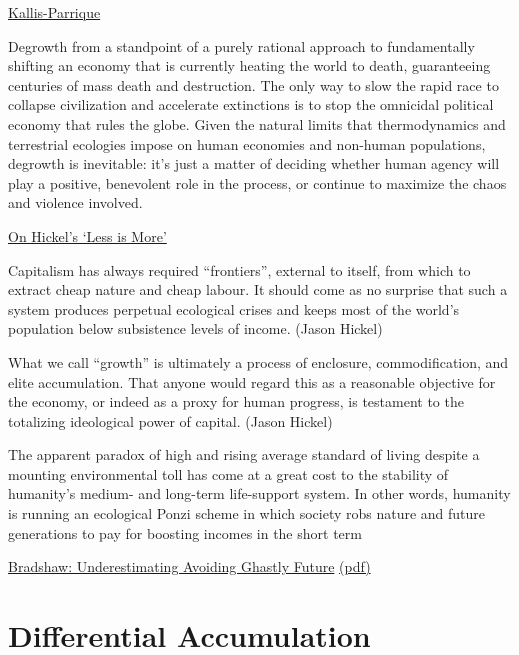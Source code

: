 \documentclass[
]{book}
\begin{document}
\href{https://braveneweurope.com/timothee-parrique-giorgos-kallis-degrowth-socialism-without-growth}{Kallis-Parrique}

Degrowth from a standpoint of a purely rational approach to fundamentally shifting an economy that is currently heating the world to death, guaranteeing centuries of mass death and destruction. The only way to slow the rapid race to collapse civilization and accelerate extinctions is to stop the omnicidal political economy that rules the globe. Given the natural limits that thermodynamics and terrestrial ecologies impose on human economies and non-human populations, degrowth is inevitable: it's just a matter of deciding whether human agency will play a positive, benevolent role in the process, or continue to maximize the chaos and violence involved.

\href{https://www.the-trouble.com/content/2021/2/11/ecosocialism-is-the-horizon-degrowth-is-the-way}{On Hickel's `Less is More'}

Capitalism has always required ``frontiers'', external to itself,
from which to extract cheap nature and cheap labour.
It should come as no surprise that such a system produces
perpetual ecological crises and keeps most of the world's
population below subsistence levels of income. (Jason Hickel)

What we call ``growth'' is ultimately a process of enclosure, commodification,
and elite accumulation.
That anyone would regard this as a reasonable objective for the economy,
or indeed as a proxy for human progress,
is testament to the totalizing ideological power of capital. (Jason Hickel)

The apparent paradox of high and rising average
standard of living despite a mounting environmental toll has
come at a great cost to the stability of humanity's medium-
and long-term life-support system. In other words, humanity is
running an ecological Ponzi scheme in which society robs nature
and future generations to pay for boosting incomes in the short
term

\href{https://www.frontiersin.org/articles/10.3389/fcosc.2020.615419/full}{Bradshaw: Underestimating Avoiding Ghastly Future}
\href{/pdf/Bradshaw_2020_Underestimating.pdf}{(pdf)}

\hypertarget{differential-accumulation}{%
\section{Differential Accumulation}\label{differential-accumulation}}
\end{document}
